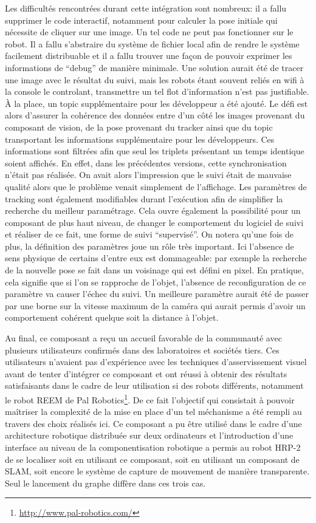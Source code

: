 Les difficultés rencontrées durant cette intégration sont nombreux: il
a fallu supprimer le code interactif, notamment pour calculer la pose
initiale qui nécessite de cliquer sur une image. Un tel code ne peut
pas fonctionner sur le robot. Il a fallu s'abstraire du système de
fichier local afin de rendre le système facilement distribuable et il
a fallu trouver une façon de pouvoir exprimer les informations de
``debug'' de manière minimale. Une solution aurait été de tracer une
image avec le résultat du suivi, mais les robots étant souvent reliés
en wifi à la console le controlant, transmettre un tel flot
d'information n'est pas justifiable. À la place, un topic
supplémentaire pour les développeur a été ajouté. Le défi est alors
d'assurer la cohérence des données entre d'un côté les images
provenant du composant de vision, de la pose provenant du tracker
ainsi que du topic transportant les informations supplémentaire pour
les développeurs. Ces informations sont filtrées afin que seul les
triplets présentant un temps identique soient affichés. En effet, dans
les précédentes versions, cette synchronisation n'était pas
réalisée. On avait alors l'impression que le suivi était de mauvaise
qualité alors que le problème venait simplement de l'affichage. Les
paramètres de tracking sont également modifiables durant l'exécution
afin de simplifier la recherche du meilleur paramétrage. Cela ouvre
également la possibilité pour un composant de plus haut niveau, de
changer le comportement du logiciel de suivi et réaliser de ce fait,
une forme de suivi ``supervisé''. On notera qu'une fois de plus, la
définition des paramètres joue un rôle très important. Ici l'absence
de sens physique de certains d'entre eux est dommageable: par exemple
la recherche de la nouvelle pose se fait dans un voisinage qui est
défini en pixel. En pratique, cela signifie que si l'on se rapproche
de l'objet, l'absence de reconfiguration de ce paramètre va causer
l'échec du suivi. Un meilleure paramètre aurait été de passer par une
borne sur la vitesse maximum de la caméra qui aurait permis d'avoir un
comportement cohérent quelque soit la distance à l'objet.


Au final, ce composant a reçu un accueil favorable de la communauté
avec plusieurs utilisateurs confirmés dans des laboratoires et
sociétés tiers. Ces utilisateurs n'avaient pas d'expérience avec les
techniques d'asservissement visuel avant de tenter d'intégrer ce
composant et ont réussi à obtenir des résultats satisfaisants dans le
cadre de leur utilisation si des robots différents, notamment le robot
REEM de Pal Robotics\footnote{\url{http://www.pal-robotics.com/}}. De
ce fait l'objectif qui consistait à pouvoir maîtriser la complexité de
la mise en place d'un tel méchanisme a été rempli au travers des choix
réalisés ici. Ce composant a pu être utilisé dans le cadre d'une
architecture robotique distribuée sur deux ordinateurs et
l'introduction d'une interface au niveau de la componentisation
robotique a permis au robot HRP-2 de se localiser soit en utilisant ce
composant, soit en utilisant un composant de SLAM, soit encore le
système de capture de mouvement de manière transparente. Seul le
lancement du graphe diffère dans ces trois cas.


